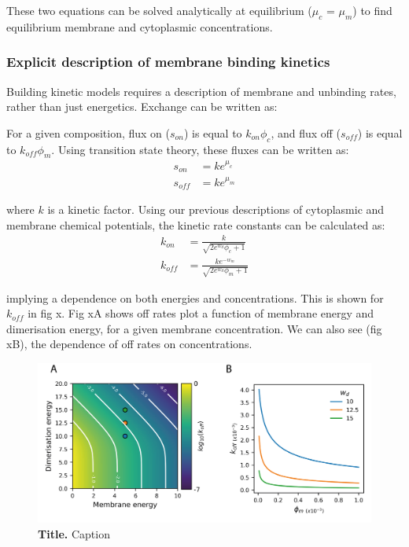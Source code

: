 \documentclass[12pt]{"article"}
\newcommand{\mycaption}[2]{\caption[#1]{\textbf{#1.} #2}}
\begin{document}
These two equations can be solved analytically at equilibrium ($\mu_c$ = $\mu_m$) to find equilibrium membrane and cytoplasmic concentrations.


\subsubsection{Explicit description of membrane binding kinetics} 

Building kinetic models requires a description of membrane and unbinding rates, rather than just energetics. Exchange can be written as:

\begin{center}
\end{center}

For a given composition, flux on ($s_{on}$) is equal to $k_{on}\phi_c$, and flux off ($s_{off}$) is equal to $k_{off}\phi_m$. Using transition state theory, these fluxes can be written as:
\begin{align}
s_{on} &= ke^{\mu_c}\\
s_{off} &= ke^{\mu_m}
\end{align}

where $k$ is a kinetic factor. Using our previous descriptions of cytoplasmic and membrane chemical potentials, the kinetic rate constants can be calculated as:
\begin{align}
k_{on} &= \frac{k}{\sqrt{2e^{w_d}\phi_c+ 1}}\\
k_{off} &= \frac{ke^{-w_m}}{\sqrt{2e^{w_d}\phi_m+ 1}}
\end{align}

implying a dependence on both energies and concentrations. This is shown for $k_{off}$ in fig x. Fig xA shows off rates plot a function of membrane energy and dimerisation energy, for a given membrane concentration. We can also see (fig xB), the dependence of off rates on concentrations.

\begin{figure}[!h]
\includegraphics[scale=1]{thermodynamic_model_koff}
\setlength{\abovecaptionskip}{20pt}
\centering
\mycaption{Title}{Caption}
\label{fig:thermodynamic_model_koff}
\end{figure}
\end{document}
